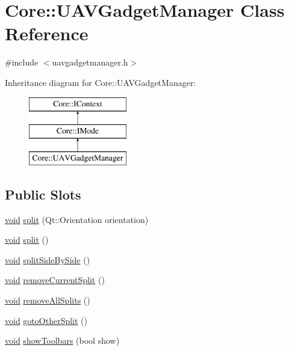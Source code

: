\hypertarget{class_core_1_1_u_a_v_gadget_manager}{\section{\-Core\-:\-:\-U\-A\-V\-Gadget\-Manager \-Class \-Reference}
\label{class_core_1_1_u_a_v_gadget_manager}
}


{\ttfamily \#include $<$uavgadgetmanager.\-h$>$}

\-Inheritance diagram for \-Core\-:\-:\-U\-A\-V\-Gadget\-Manager\-:\begin{figure}[H]
\begin{center}
\leavevmode
\includegraphics[height=3.000000cm]{class_core_1_1_u_a_v_gadget_manager}
\end{center}
\end{figure}
\subsection*{\-Public \-Slots}
\begin{DoxyCompactItemize}
\item 
\hyperlink{group___u_a_v_objects_plugin_ga444cf2ff3f0ecbe028adce838d373f5c}{void} \hyperlink{group___core_plugin_gaeccb858176046a9efd6e76d0af690e6e}{split} (\-Qt\-::\-Orientation orientation)
\item 
\hyperlink{group___u_a_v_objects_plugin_ga444cf2ff3f0ecbe028adce838d373f5c}{void} \hyperlink{group___core_plugin_gabcf94b780cce894a494827a231c8cfa0}{split} ()
\item 
\hyperlink{group___u_a_v_objects_plugin_ga444cf2ff3f0ecbe028adce838d373f5c}{void} \hyperlink{group___core_plugin_ga65f8524b1999c58d5305b0f8c3cc84ee}{split\-Side\-By\-Side} ()
\item 
\hyperlink{group___u_a_v_objects_plugin_ga444cf2ff3f0ecbe028adce838d373f5c}{void} \hyperlink{group___core_plugin_ga189fbe44cfc2b4df765a10f7d37a83de}{remove\-Current\-Split} ()
\item 
\hyperlink{group___u_a_v_objects_plugin_ga444cf2ff3f0ecbe028adce838d373f5c}{void} \hyperlink{group___core_plugin_gac19293d686a36bafedf7bc2d0b27cb5f}{remove\-All\-Splits} ()
\item 
\hyperlink{group___u_a_v_objects_plugin_ga444cf2ff3f0ecbe028adce838d373f5c}{void} \hyperlink{group___core_plugin_gadc47479bc2f304826deef399d7c6d648}{goto\-Other\-Split} ()
\item 
\hyperlink{group___u_a_v_objects_plugin_ga444cf2ff3f0ecbe028adce838d373f5c}{void} \hyperlink{group___core_plugin_ga590e40dadf41f290707043f35457a196}{show\-Toolbars} (bool show)
\end{DoxyCompactItemize}
